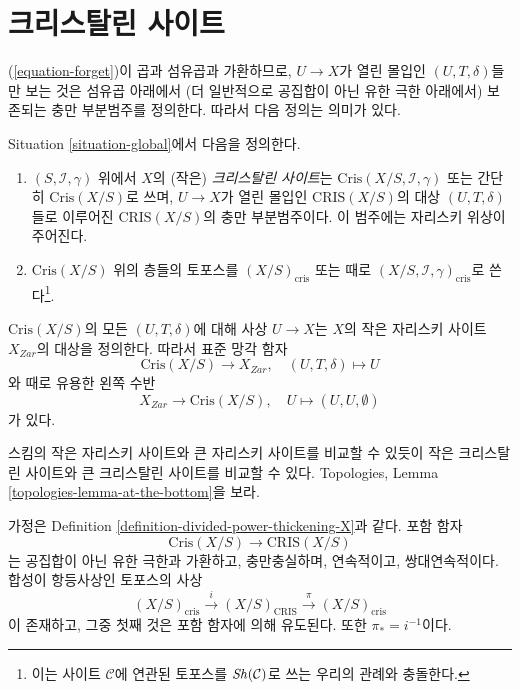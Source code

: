 \section{크리스탈린 사이트}
\label{section-site}

\noindent
(\ref{equation-forget})이 곱과 섬유곱과 가환하므로, $U \to X$가
열린 몰입인 $(U, T, \delta)$들만 보는 것은 섬유곱 아래에서
(더 일반적으로 공집합이 아닌 유한 극한 아래에서) 보존되는
충만 부분범주를 정의한다. 따라서 다음 정의는 의미가 있다.

\begin{definition}
\label{definition-crystalline-site}
Situation \ref{situation-global}에서 다음을 정의한다.
\begin{enumerate}
\item $(S, \mathcal{I}, \gamma)$ 위에서 $X$의 (작은)
{\it 크리스탈린 사이트}는 $\text{Cris}(X/S, \mathcal{I}, \gamma)$
또는 간단히 $\text{Cris}(X/S)$로 쓰며, $U \to X$가 열린 몰입인
$\text{CRIS}(X/S)$의 대상 $(U, T, \delta)$들로 이루어진
$\text{CRIS}(X/S)$의 충만 부분범주이다. 이 범주에는 자리스키
위상이 주어진다.
\item $\text{Cris}(X/S)$ 위의 층들의 토포스를
$(X/S)_{\text{cris}}$ 또는 때로
$(X/S, \mathcal{I}, \gamma)_{\text{cris}}$로 쓴다\footnote{이는
사이트 $\mathcal{C}$에 연관된 토포스를 $\mathop{\mathit{Sh}}\nolimits(\mathcal{C})$로 쓰는
우리의 관례와 충돌한다.}.
\end{enumerate}
\end{definition}

\noindent
$\text{Cris}(X/S)$의 모든 $(U, T, \delta)$에 대해 사상 $U \to X$는
$X$의 작은 자리스키 사이트 $X_{Zar}$의 대상을 정의한다.
따라서 표준 망각 함자
\begin{equation}
\label{equation-forget-small}
\text{Cris}(X/S) \longrightarrow X_{Zar},\quad
(U, T, \delta) \longmapsto U
\end{equation}
와 때로 유용한 왼쪽 수반
\begin{equation}
\label{equation-endow-trivial-small}
X_{Zar} \longrightarrow \text{Cris}(X/S),\quad
U \longmapsto (U, U, \emptyset)
\end{equation}
가 있다.

\medskip\noindent
스킴의 작은 자리스키 사이트와 큰 자리스키 사이트를 비교할 수
있듯이 작은 크리스탈린 사이트와 큰 크리스탈린 사이트를 비교할 수 있다.
Topologies, Lemma \ref{topologies-lemma-at-the-bottom}을 보라.

\begin{lemma}
\label{lemma-compare-big-small}
가정은 Definition \ref{definition-divided-power-thickening-X}과 같다.
포함 함자
$$
\text{Cris}(X/S) \to \text{CRIS}(X/S)
$$
는 공집합이 아닌 유한 극한과 가환하고, 충만충실하며, 연속적이고,
쌍대연속적이다. 합성이 항등사상인 토포스의 사상
$$
(X/S)_{\text{cris}} \xrightarrow{i} (X/S)_{\text{CRIS}}
\xrightarrow{\pi} (X/S)_{\text{cris}}
$$
이 존재하고, 그중 첫째 것은 포함 함자에 의해 유도된다.
또한 $\pi_* = i^{-1}$이다.
\end{lemma}

